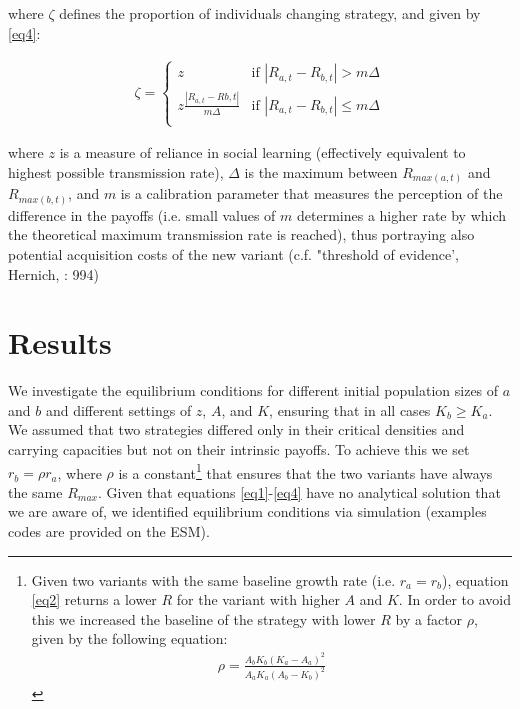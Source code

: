 \documentclass[review,authoryear]{elsarticle}
\begin{document}
where $\zeta$ defines the proportion of individuals changing strategy, and given by \eqref{eq4}:

\begin{equation}
\begin{aligned}
\label{eq4}
\zeta = 
\begin{cases}
z& \text{if }|R_{a,t}-R_{b,t}| > m\Delta\\
z\frac{|R_{a,t}-R{b,t}|}{m\Delta}& \text{if }|R_{a,t}-R_{b,t}| \leq m\Delta\\
\end{cases}
\end{aligned}
\end{equation}

where $z$ is a measure of reliance in social learning (effectively equivalent to highest possible transmission rate), $\Delta$ is the maximum between $R_{max(a,t)}$ and $R_{max(b,t)}$, and $m$ is a calibration parameter that measures the perception of the difference in the payoffs (i.e. small values of $m$ determines a higher rate by which the theoretical maximum transmission rate is reached), thus portraying also potential acquisition costs of the new variant (c.f. "threshold of evidence', Hernich, \citeyear{henrich2001cultural}: 994)

\section{Results}

We investigate the equilibrium conditions for different initial population sizes of $a$ and $b$ and different settings of $z$, $A$, and $K$, ensuring that in all cases $K_b \geq K_a$. We assumed that two strategies differed only in their critical densities and carrying capacities but not on their intrinsic payoffs. To achieve this we set $r_b=\rho r_a$, where $\rho$ is a constant\footnote{Given two variants with the same baseline growth rate (i.e. $r_a=r_b$), equation \eqref{eq2} returns a lower $R$ for the variant with higher $A$ and $K$. In order to avoid this we increased the baseline of the strategy with lower $R$ by a factor $\rho$, given by the following equation:
\begin{align*}
\rho=\frac{A_bK_b(K_a-A_a)^2}{A_aK_a(A_b-K_b)^2}
\end{align*}
  } 
that ensures that the two variants have always the same $R_{max}$. Given that equations \ref{eq1}-\ref{eq4} have no analytical solution that we are aware of, we identified equilibrium conditions via simulation (examples codes are provided on the ESM).
\end{document}

